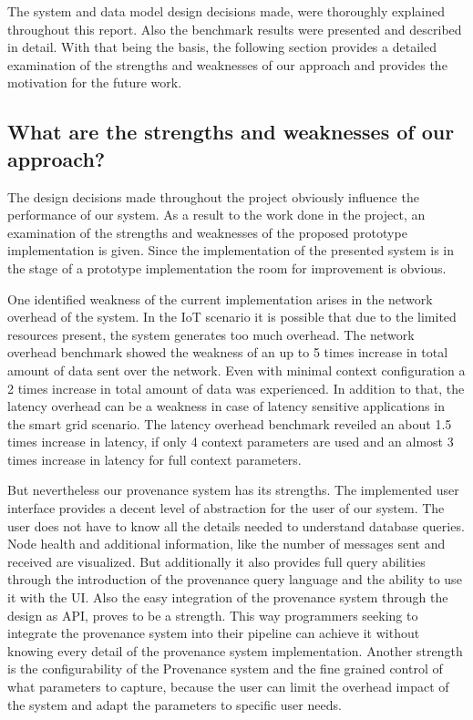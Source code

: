The system and data model design decisions made, were thoroughly explained throughout this report. Also the benchmark results were presented and described in detail. With that being the basis, the following section provides a detailed examination of the strengths and weaknesses of our approach and provides the motivation for the future work.
\subsection{What are the strengths and weaknesses of our approach?}
The design decisions made throughout the project obviously influence the performance of our system. As a result to the work done in the project, an examination of the strengths and weaknesses of the proposed prototype implementation is given. 
Since the implementation of the presented system is in the stage of a prototype implementation the room for improvement is obvious.

One identified weakness of the current implementation arises in the network overhead of the system. In the IoT scenario it is possible that due to the limited resources present, the system generates too much overhead. The network overhead benchmark showed the weakness of an up to 5 times increase in total amount of data sent over the network. Even with minimal context configuration a 2 times increase in total amount of data was experienced.
In addition to that, the latency overhead can be a weakness in case of latency sensitive applications in the smart grid scenario. The latency overhead benchmark reveiled an about 1.5 times increase in latency, if only 4 context parameters are used and an almost 3 times increase in latency for full context parameters.

But nevertheless our provenance system has its strengths. 
The implemented user interface provides a decent level of abstraction for the user of our system. The user does not have to know all the details needed to understand database queries. Node health and additional information, like the number of messages sent and received are visualized. But additionally it also provides full query abilities through the introduction of the provenance query language and the ability to use it with the UI. Also the easy integration of the provenance system through the design as API, proves to be a strength. This way programmers seeking to integrate the provenance system into their pipeline can achieve it without knowing every detail of the provenance system implementation. Another strength is the configurability of the Provenance system and the fine grained control of what parameters to capture, because the user can limit the overhead impact of the system and adapt the parameters to specific user needs.

